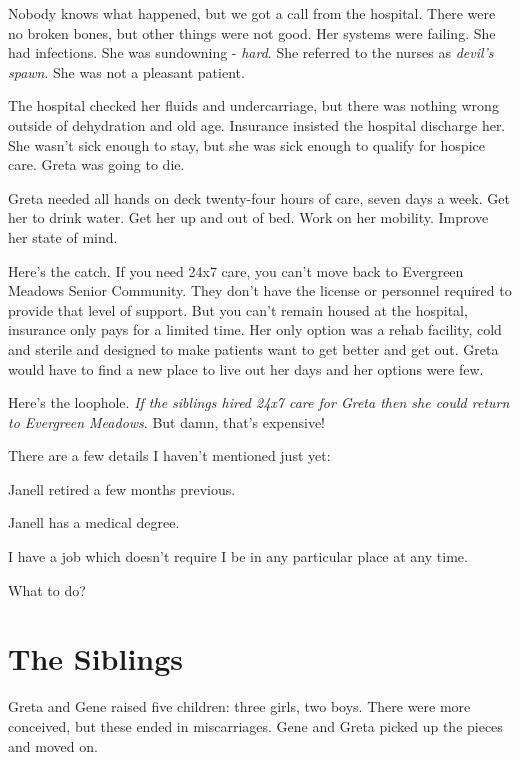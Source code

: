 \documentclass[
  letterpaper,
  DIV=11,
  numbers=noendperiod]{scrreprt}
\begin{document}
Nobody knows what happened, but we got a call from the hospital. There
were no broken bones, but other things were not good. Her systems were
failing. She had infections. She was sundowning - \emph{hard}. She
referred to the nurses as \emph{devil's spawn}. She was not a pleasant
patient.

The hospital checked her fluids and undercarriage, but there was nothing
wrong outside of dehydration and old age. Insurance insisted the
hospital discharge her. She wasn't sick enough to stay, but she was sick
enough to qualify for hospice care. Greta was going to die.

Greta needed all hands on deck twenty-four hours of care, seven days a
week. Get her to drink water. Get her up and out of bed. Work on her
mobility. Improve her state of mind.

Here's the catch. If you need 24x7 care, you can't move back to
Evergreen Meadows Senior Community. They don't have the license or
personnel required to provide that level of support. But you can't
remain housed at the hospital, insurance only pays for a limited time.
Her only option was a rehab facility, cold and sterile and designed to
make patients want to get better and get out. Greta would have to find a
new place to live out her days and her options were few.

Here's the loophole. \emph{If the siblings hired 24x7 care for Greta
then she could return to Evergreen Meadows}. But damn, that's expensive!

There are a few details I haven't mentioned just yet:

Janell retired a few months previous.

Janell has a medical degree.

I have a job which doesn't require I be in any particular place at any
time.

What to do?


\chapter*{The Siblings}\label{the-siblings}


Greta and Gene raised five children: three girls, two boys. There were
more conceived, but these ended in miscarriages. Gene and Greta picked
up the pieces and moved on.
\end{document}
